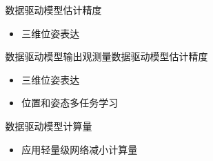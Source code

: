 \begin{frame}
\begin{columns}[t]
\begin{column}{0.5\textwidth}
		\end{column}   
		\begin{column}{0.5\textwidth}
			\begin{block}{数据驱动模型估计精度}
			   {
			       \footnotesize
					\begin{itemize}
						\item 三维位姿表达
					\end{itemize}
				}
			\end{block}
		    \begin{block}{数据驱动模型输出观测量}数据驱动模型估计精度
  			    {
  			        \footnotesize
					\begin{itemize}
						\item 三维位姿表达
						\item 位置和姿态多任务学习
					\end{itemize}
				}
			\end{block}
			\begin{block}{数据驱动模型计算量}
			    {
			        \footnotesize
					\begin{itemize}
						\item 应用轻量级网络减小计算量
					\end{itemize}
				}
			\end{block}
		\end{column}
	\end{columns}	
\end{frame}


